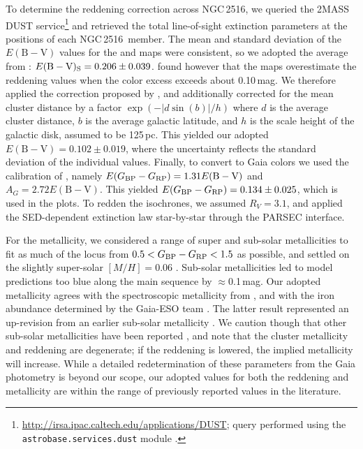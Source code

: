 \documentclass[12pt,twocolumn,tighten]{aastex63}
\newcommand{\cn}{NGC\,2516} %
\newcommand{\bpmrp}{G_{\rm BP}-G_{\rm RP}}
\begin{document}
To determine the reddening correction across \cn, we queried the 2MASS
DUST service\footnote{
  \url{http://irsa.ipac.caltech.edu/applications/DUST}; query
  performed using the \texttt{astrobase.services.dust} module
  \citep{bhatti_astrobase_2018}.  } and retrieved the total
line-of-sight extinction parameters at the positions of each \cn\ 
member.  The mean and standard deviation of the
$E(\mathrm{B}-\mathrm{V})$ values for the \citet{schlegel_maps_1998}
and \citet{schlafly_measuring_2011} maps were consistent, so we
adopted the average from \citet{schlegel_maps_1998}:
$E(\mathrm{B}-\mathrm{V})_{\rm S}=0.206\pm0.039$.
\citet{bonifacio_search_2000} found however that the
\citet{schlegel_maps_1998} maps overestimate the reddening values when
the color excess exceeds about 0.10\,mag. We therefore applied the
correction proposed by \citet{bonifacio_search_2000}, and additionally
corrected for the mean cluster distance by a factor
$\exp(-|d\sin(b)|/h)$ where $d$ is the average cluster distance,
$b$ is the average galactic latitude, and $h$ is the scale height of
the galactic disk, assumed to be 125\,pc.  This yielded our adopted
$E(\mathrm{B}-\mathrm{V})=0.102\pm0.019$, where the uncertainty
reflects the standard deviation of the individual
\citet{schlegel_maps_1998} values.  Finally, to convert to Gaia
colors we used the calibration of \citet{stassun_TIC8_2019}, namely
$E(\bpmrp)=1.31 E(\mathrm{B}-\mathrm{V})$ and
$A_G=2.72 E(\mathrm{B}-\mathrm{V})$.  This yielded
$E(\bpmrp)=0.134\pm0.025$, which is used in the
plots.  To redden the isochrones, we assumed $R_V=3.1$, and applied
the \citet{odonnell_1994} SED-dependent extinction law star-by-star
through the PARSEC interface. 

For the metallicity, we considered a range of super and sub-solar
metallicities to fit as much of the locus from
$0.5<\bpmrp<1.5$ as possible, and settled on the
slightly super-solar $[M/H]=0.06$ \citep{cummings_2011_li_iron}.
Sub-solar metallicities led to model predictions too blue along the
main sequence by $\approx$0.1\,mag.  Our adopted metallicity agrees
with the spectroscopic metallicity from
\citet[][Sec~4.4.4]{cummings_2011_li_iron}, and with the iron
abundance determined by the Gaia-ESO team
\citep{baratella_gaiaeso_2020}. The latter result represented an up-revision from
an earlier sub-solar metallicity \citep{randich_gaiaeso_2018}.  We
caution though that other sub-solar metallicities have been reported
\citep{bailey_rv_2018}, and note that the cluster metallicity and
reddening are degenerate; if the reddening is lowered, the implied
metallicity will increase.  While a detailed redetermination of
these parameters from the Gaia photometry is beyond our scope, our
adopted values for both the reddening and metallicity are within the
range of previously reported values in the literature.
\end{document}
